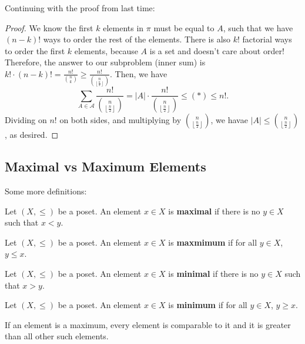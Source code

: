 \documentclass[a4paper]{article}
\begin{document}

Continuing with the proof from last time:

\begin{proof}
	We know the first \( k \) elements in \( \pi  \) must be equal to \( A \), such that we have \( (n-k)! \) ways to order the rest of the elements. There is also \( k! \) factorial ways to order the first \( k \) elements, because \( A \) is a set and doesn't care about order! Therefore, the answer to our subproblem (inner sum) is \( k!\cdot (n-k)! = \frac{n!}{\binom{n}{k}} \ge \frac{n!}{\binom{n}{\left\lfloor \frac{n}{2} \right\rfloor}}\). Then, we have \[
		\sum_{A \in \mathcal{A}} \frac{n!}{\binom{n}{\left\lfloor \frac{n}{2} \right\rfloor}} = |A| \cdot \frac{n!}{\binom{n}{\left\lfloor \frac{n}{2} \right\rfloor}} \le (*) \le n!
	.\] Dividing on \( n! \) on both sides, and multiplying by \( \binom{n}{\left\lfloor \frac{n}{2} \right\rfloor} \), we havae \( |A| \le \binom{n}{\left\lfloor \frac{n}{2} \right\rfloor} \), as desired.
\end{proof}

\subsection{Maximal vs Maximum Elements}

Some more definitions:

\begin{definition}
	Let \( (X,\le ) \) be a poset. An element \( x \in X \) is \textbf{maximal} if there is no \( y \in X \) such that \( x<y \).
\end{definition}

\begin{definition}
	Let \( (X,\le ) \) be a poset. An element \( x \in X \) is \textbf{maxmimum} if for all \( y \in X \), \( y \le x \).
\end{definition}

\begin{definition}
	Let \( (X,\le ) \) be a poset. An element \( x \in X \) is \textbf{minimal} if there is no \( y \in X \) such that \( x>y \).
\end{definition}

\begin{definition}
	Let \( (X,\le ) \) be a poset. An element \( x \in X \) is \textbf{minimum} if for all \( y \in X \), \( y \ge x \).
\end{definition}

\begin{note}
	If an element is a maximum, every element is comparable to it and it is greater than all other such elements. 
\end{note}
\end{document}
